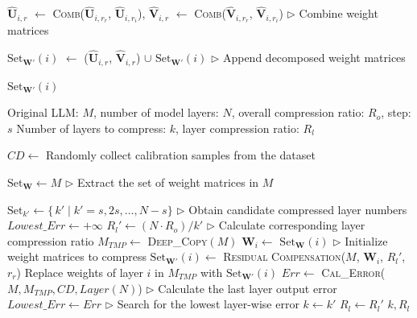 \begin{algorithm}[ht]
\begin{algorithmic}[1]
        \STATE $\hat{\boldsymbol{U}}_{i,r}$ $\gets$ \textsc{Comb}($\hat{\boldsymbol{U}}_{i,r_r}$, $\hat{\boldsymbol{U}}_{i,r_i}$), $\hat{\boldsymbol{V}}_{i,r}$ $\gets$ \textsc{Comb}($\hat{\boldsymbol{V}}_{i,r_r}$, $\hat{\boldsymbol{V}}_{i,r_i}$) \hfill $\triangleright$ Combine weight matrices  

        \STATE $\mathrm{Set}_{\boldsymbol{W'}}(i)$ $\gets$ ($\hat{\boldsymbol{U}}_{i,r}$, $\hat{\boldsymbol{V}}_{i,r}$) $\cup$ $\mathrm{Set}_{\boldsymbol{W'}}(i)$ \hfill $\triangleright$ Append decomposed weight matrices
            
        
        \RETURN $\mathrm{Set}_{\boldsymbol{W'}}(i)$
    \end{algorithmic}
\end{algorithm}

\begin{algorithm}[ht]
  \caption{Pseudocode of Partial-layer Compression}
    \label{alg_plc}
    \renewcommand{\algorithmicrequire}{\textbf{Input:}}
    \renewcommand{\algorithmicensure}{\textbf{Output:}}
  \begin{algorithmic}[1]
    \REQUIRE Original LLM: $M$, number of model layers: $N$, overall compression ratio: $R_o$, step: $s$ %
    \ENSURE Number of layers to compress: $k$, layer compression ratio: $R_l$   %

    \STATE $CD \gets$ Randomly collect calibration samples from the dataset
    
    \STATE $\mathrm{Set}_{\boldsymbol{W}} \gets M$ \hfill $\triangleright$ Extract the set of weight matrices in $M$
    
    \STATE $\mathrm{Set}_{k'} \gets \{\,k' \mid k'=s,2s,\dots,N-s\}$ \hfill $\triangleright$ Obtain candidate compressed layer numbers
    \STATE $ Lowest\_Err \gets +\infty$
        \STATE $R_l' \gets (N \cdot R_o) / k'$ \hfill $\triangleright$ Calculate corresponding layer compression ratio 
            \STATE $M_{TMP} \gets$ \textsc{Deep\_Copy}$(M)$
                \STATE $\textbf{W}_i \gets$ $\mathrm{Set}_{\boldsymbol{W}}(i)$ \hfill $\triangleright$ Initialize weight matrices to compress
                \STATE $\mathrm{Set}_{\boldsymbol{W'}}(i) \gets$ \textsc{Residual Compensation}($M$, $\textbf{W}_i$, $R_l'$, $r_r$)
                \STATE Replace weights of layer $i$ in $M_{TMP}$ with $\mathrm{Set}_{\boldsymbol{W'}}(i)$
            \ENDFOR
            \STATE $Err \gets$ \textsc{Cal\_Error}($M, M_{TMP}, CD, Layer(N)$) \hfill $\triangleright$ Calculate the last layer output error
                \STATE $Lowest\_Err \gets Err$ \hfill $\triangleright$ Search for the lowest layer-wise error
                \STATE $k   \gets k'$
                \STATE $R_l \gets R_l'$
            \ENDIF
        \ENDIF
    \ENDFOR
    \RETURN $k, R_l$
  \end{algorithmic}
\end{algorithm}

